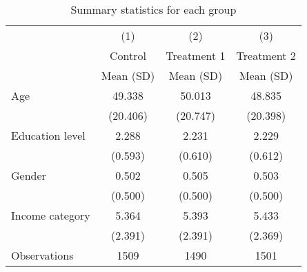 \begin{table}[htbp]\centering
\def\sym#1{\ifmmode^{#1}\else\(^{#1}\)\fi}
\caption{Summary statistics for each group}
\begin{tabular}{l*{3}{c}}
\hline\hline
                    &\multicolumn{1}{c}{(1)}&\multicolumn{1}{c}{(2)}&\multicolumn{1}{c}{(3)}\\
                    &\multicolumn{1}{c}{Control}&\multicolumn{1}{c}{Treatment 1}&\multicolumn{1}{c}{Treatment 2}\\
                    &   Mean (SD)&   Mean (SD)&   Mean (SD)\\
\hline
Age                 &      49.338&      50.013&      48.835\\
                    &    (20.406)&    (20.747)&    (20.398)\\
Education level     &       2.288&       2.231&       2.229\\
                    &     (0.593)&     (0.610)&     (0.612)\\
Gender              &       0.502&       0.505&       0.503\\
                    &     (0.500)&     (0.500)&     (0.500)\\
Income category     &       5.364&       5.393&       5.433\\
                    &     (2.391)&     (2.391)&     (2.369)\\
\hline
Observations        &        1509&        1490&        1501\\
\hline\hline
\end{tabular}
\end{table}

